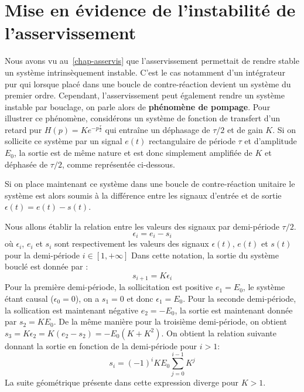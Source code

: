 \section[Instabilité de l'asservissement]
{Mise en évidence de l'instabilité de l'asservissement}
Nous avons vu au~\cref{chap-asservis} que l'asservissement permettait de
rendre stable un système intrinsèquement instable. C'est le cas notamment d'un 
intégrateur pur qui lorsque placé dans une boucle de contre-réaction devient
un système du premier ordre.
Cependant, l'asservissement peut également rendre un système instable par
bouclage, on parle alors de \textbf{phénomène de pompage}.
Pour illustrer ce phénomène\cite{genouel}, considérons un système de fonction 
de transfert d'un retard pur $H(p)=Ke^{-p\frac{\tau}{2}}$ qui entraîne 
un déphasage de $\tau/2$ et de gain $K$. Si on sollicite ce système par un 
signal $e(t)$ rectangulaire de période $\tau$ et d'amplitude $E_0$, la sortie 
est de même nature et est donc simplement amplifiée de $K$ et déphasée 
de $\tau/2$, comme représentée ci-dessous.
\begin{center}
    
\end{center}
Si on place maintenant ce système dans une boucle de contre-réaction 
unitaire le système est alors soumis à la différence entre les signaux 
d'entrée et de sortie $\epsilon(t)=e(t)-s(t)$. 
\begin{center}
    
\end{center}
Nous allons établir la relation 
entre les valeurs des signaux par demi-période $\tau/2$. 
\[
    \epsilon_i=e_i-s_i
\]
où $\epsilon_i$, $e_i$ et $s_i$ sont respectivement les valeurs des signaux 
$\epsilon(t)$, $e(t)$ et $s(t)$ pour la demi-période $i\in[1,+\infty]$
Dans cette notation, la sortie du système bouclé est donnée par : 
\[
    s_{i+1}=K\epsilon_i
\]
Pour la première demi-période, la sollicitation est positive $e_1=E_0$, 
le système étant causal ($\epsilon_0=0$), on a $s_1=0$ et donc $\epsilon_1=E_0$.
Pour la seconde demi-période, la sollication est maintenant négative $e_2=-E_0$,
la sortie est maintenant donnée par $s_2=KE_0$. De la même manière pour 
la troisième demi-période, on obtient $s_3=K\epsilon_2=K(e_2-s_2)=-E_0(K+K^2)$. 
On obtient la relation suivante donnant la sortie en fonction de la 
demi-période pour $i>1$:
\[
    s_i=(-1)^{i}KE_0\sum\limits_{j=0}^{i-1} K^j
\]
La suite géométrique présente dans cette expression diverge pour $K>1$.

